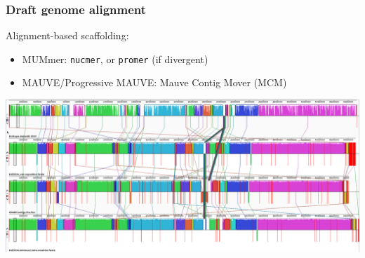 %
\begin{frame}
  \frametitle{Draft genome alignment}
  Alignment-based scaffolding:
  \begin{itemize}
    \item \textcolor{hutton_blue}{MUMmer}: \texttt{nucmer}, or \texttt{promer} (if divergent)
    \item \textcolor{hutton_purple}{MAUVE/Progressive MAUVE}: Mauve Contig Mover (MCM)
  \end{itemize}
  \begin{center}
    \includegraphics[width=\textwidth]{images/mauve_scaffolding}
  \end{center}    
\end{frame}
